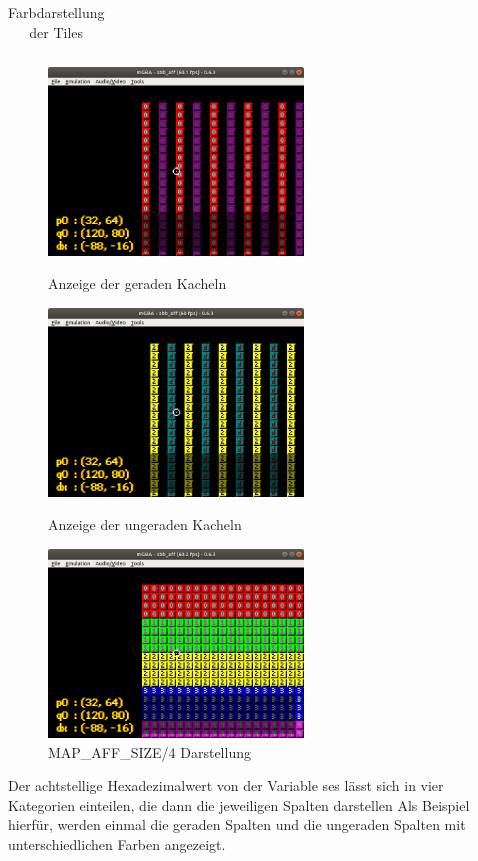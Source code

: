 \begin{table}[h]
{\begin{tabular}{|l|l|l|l|l|l|l|l|l|}
\end{tabular}%
}
\caption{Farbdarstellung der Tiles}
\label{tilesfarbe}
\end{table}
\newpage
\begin{figure}
	\includegraphics[height=50mm]{img/gerade.png}
	\caption{Anzeige der geraden Kacheln}
	\includegraphics[height=50mm]{img/ungerade.png}
	\caption{Anzeige der ungeraden Kacheln}
	\includegraphics[height=50mm]{img/mapaffsize.png}
	\caption{MAP\_AFF\_SIZE/4 Darstellung}
\end{figure}
Der achtstellige Hexadezimalwert von der Variable ses lässt sich in vier Kategorien einteilen, die dann die jeweiligen Spalten darstellen
Als Beispiel hierfür, werden einmal die geraden Spalten und die ungeraden Spalten mit unterschiedlichen Farben angezeigt. 
